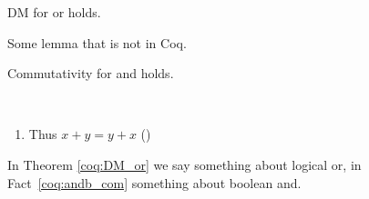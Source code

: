 \documentclass{article}
\theoremstyle{coqtheorem}
\begin{document}
\begin{theorem}[][DM_or]
  DM for or holds.
\end{theorem}

\begin{lemma}[Name]
  Some lemma that is not in Coq.
\end{lemma}

\begin{lemma}
  Commutativity for and holds.
\end{lemma}

\begin{fact}~
  \begin{enumerate}
    \coqitem[plus_O] $x + 0 = x$
    \coqitem[plus_S] $x + S y = S (x + y)$
    \item Thus $x + y = y + x$ ()
  \end{enumerate}
\end{fact}

In Theorem \ref{coq:DM_or} we say something about logical or, in
Fact~\ref{coq:andb_com} something about boolean and.
\end{document}

